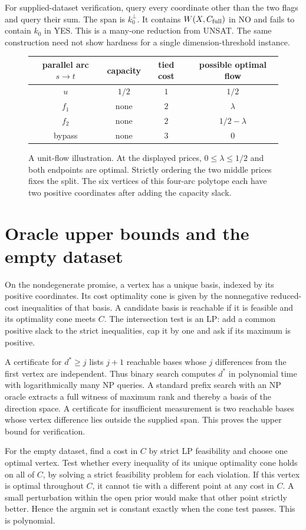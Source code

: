 \documentclass[11pt,a4paper]{amsart}
\newcommand{\NP}{\mathrm{NP}}
\begin{document}
For supplied-dataset verification, query every coordinate other than the two flags and query their sum. The span is $k_0^\perp$. It contains $W(X,C_{\rm full})$ in NO and fails to contain $k_0$ in YES. This is a many-one reduction from UNSAT. The same construction need not show hardness for a single dimension-threshold instance.

\begin{figure}[t]
\centering
\setlength{\tabcolsep}{9pt}
\begin{tabular}{c|c|c|c}
parallel arc $s\to t$ & capacity & tied cost & possible optimal flow\\ \hline
$u$ & $1/2$ & $1$ & $1/2$\\
$f_1$ & none & $2$ & $\lambda$\\
$f_2$ & none & $2$ & $1/2-\lambda$\\
bypass & none & $3$ & $0$
\end{tabular}
\caption{A unit-flow illustration. At the displayed prices, $0\leq\lambda\leq1/2$ and both endpoints are optimal. Strictly ordering the two middle prices fixes the split. The six vertices of this four-arc polytope each have two positive coordinates after adding the capacity slack.}
\end{figure}

\section{Oracle upper bounds and the empty dataset}
On the nondegenerate promise, a vertex has a unique basis, indexed by its positive coordinates. Its cost optimality cone is given by the nonnegative reduced-cost inequalities of that basis. A candidate basis is reachable if it is feasible and its optimality cone meets $C$. The intersection test is an LP: add a common positive slack to the strict inequalities, cap it by one and ask if its maximum is positive.

A certificate for $d^*\geq j$ lists $j+1$ reachable bases whose $j$ differences from the first vertex are independent. Thus binary search computes $d^*$ in polynomial time with logarithmically many $\NP$ queries. A standard prefix search with an $\NP$ oracle extracts a full witness of maximum rank and thereby a basis of the direction space. A certificate for insufficient measurement is two reachable bases whose vertex difference lies outside the supplied span. This proves the upper bound for verification.

For the empty dataset, find a cost in $C$ by strict LP feasibility and choose one optimal vertex. Test whether every inequality of its unique optimality cone holds on all of $C$, by solving a strict feasibility problem for each violation. If this vertex is optimal throughout $C$, it cannot tie with a different point at any cost in $C$. A small perturbation within the open prior would make that other point strictly better. Hence the argmin set is constant exactly when the cone test passes. This is polynomial.
\end{document}

